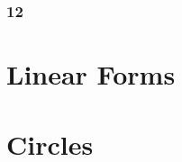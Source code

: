 \documentclass[11pt]{book}
\begin{document}
\subsection{12}


%
%



\chapter{Linear Forms}
%
%

\chapter{Circles}

%
\end{document}
